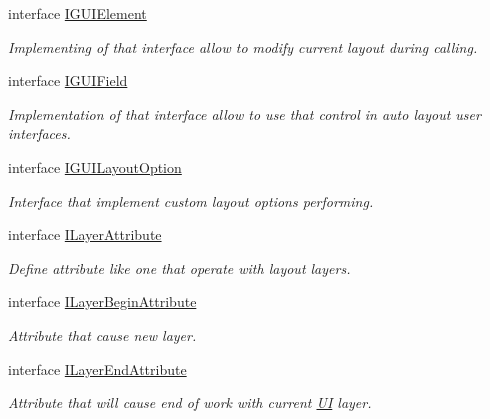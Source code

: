 \begin{DoxyCompactItemize}
\item 
interface \mbox{\hyperlink{interface_wpf_handler_1_1_u_i_1_1_auto_layout_1_1_i_g_u_i_element}{I\+G\+U\+I\+Element}}
\begin{DoxyCompactList}\small\item\em Implementing of that interface allow to modify current layout during calling. \end{DoxyCompactList}\item 
interface \mbox{\hyperlink{interface_wpf_handler_1_1_u_i_1_1_auto_layout_1_1_i_g_u_i_field}{I\+G\+U\+I\+Field}}
\begin{DoxyCompactList}\small\item\em Implementation of that interface allow to use that control in auto layout user interfaces. \end{DoxyCompactList}\item 
interface \mbox{\hyperlink{interface_wpf_handler_1_1_u_i_1_1_auto_layout_1_1_i_g_u_i_layout_option}{I\+G\+U\+I\+Layout\+Option}}
\begin{DoxyCompactList}\small\item\em Interface that implement custom layout options performing. \end{DoxyCompactList}\item 
interface \mbox{\hyperlink{interface_wpf_handler_1_1_u_i_1_1_auto_layout_1_1_i_layer_attribute}{I\+Layer\+Attribute}}
\begin{DoxyCompactList}\small\item\em Define attribute like one that operate with layout layers. \end{DoxyCompactList}\item 
interface \mbox{\hyperlink{interface_wpf_handler_1_1_u_i_1_1_auto_layout_1_1_i_layer_begin_attribute}{I\+Layer\+Begin\+Attribute}}
\begin{DoxyCompactList}\small\item\em Attribute that cause new layer. \end{DoxyCompactList}\item 
interface \mbox{\hyperlink{interface_wpf_handler_1_1_u_i_1_1_auto_layout_1_1_i_layer_end_attribute}{I\+Layer\+End\+Attribute}}
\begin{DoxyCompactList}\small\item\em Attribute that will cause end of work with current \mbox{\hyperlink{namespace_wpf_handler_1_1_u_i}{UI}} layer. \end{DoxyCompactList}\item 

\end{DoxyCompactItemize}
